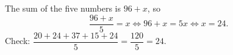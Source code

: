 The sum of the five numbers is $96+x$, so
\[
\dfrac{96+x}{5}=x\iff96+x=5x\iff x=\boxed{24}.
\]
Check: $\dfrac{20+24+37+15+24}{5}=\dfrac{120}{5}=24$.
